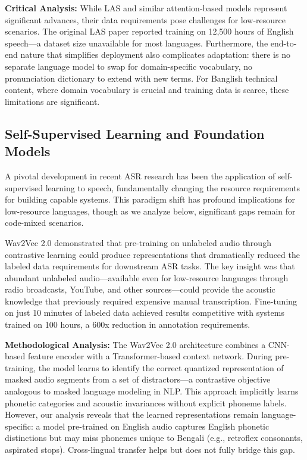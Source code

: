 \textbf{Critical Analysis:} While LAS and similar attention-based models represent significant advances, their data requirements pose challenges for low-resource scenarios. The original LAS paper reported training on 12,500 hours of English speech---a dataset size unavailable for most languages. Furthermore, the end-to-end nature that simplifies deployment also complicates adaptation: there is no separate language model to swap for domain-specific vocabulary, no pronunciation dictionary to extend with new terms. For Banglish technical content, where domain vocabulary is crucial and training data is scarce, these limitations are significant.

\subsection{Self-Supervised Learning and Foundation Models}

A pivotal development in recent ASR research has been the application of self-supervised learning to speech, fundamentally changing the resource requirements for building capable systems. This paradigm shift has profound implications for low-resource languages, though as we analyze below, significant gaps remain for code-mixed scenarios.

Wav2Vec 2.0 \cite{Baevski2020} demonstrated that pre-training on unlabeled audio through contrastive learning could produce representations that dramatically reduced the labeled data requirements for downstream ASR tasks. The key insight was that abundant unlabeled audio---available even for low-resource languages through radio broadcasts, YouTube, and other sources---could provide the acoustic knowledge that previously required expensive manual transcription. Fine-tuning on just 10 minutes of labeled data achieved results competitive with systems trained on 100 hours, a 600x reduction in annotation requirements.

\textbf{Methodological Analysis:} The Wav2Vec 2.0 architecture combines a CNN-based feature encoder with a Transformer-based context network. During pre-training, the model learns to identify the correct quantized representation of masked audio segments from a set of distractors---a contrastive objective analogous to masked language modeling in NLP. This approach implicitly learns phonetic categories and acoustic invariances without explicit phoneme labels. However, our analysis reveals that the learned representations remain language-specific: a model pre-trained on English audio captures English phonetic distinctions but may miss phonemes unique to Bengali (e.g., retroflex consonants, aspirated stops). Cross-lingual transfer helps but does not fully bridge this gap.

